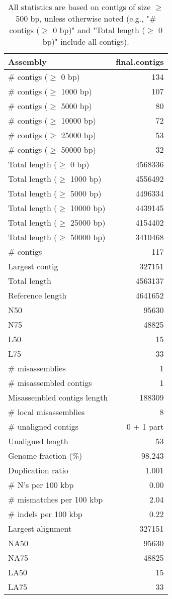 \documentclass[12pt,a4paper]{article}
\begin{document}
\begin{table}[ht]
\begin{center}
\caption{All statistics are based on contigs of size $\geq$ 500 bp, unless otherwise noted (e.g., "\# contigs ($\geq$ 0 bp)" and "Total length ($\geq$ 0 bp)" include all contigs).}
\begin{tabular}{|l*{1}{|r}|}
\hline
Assembly & final.contigs \\ \hline
\# contigs ($\geq$ 0 bp) & 134 \\ \hline
\# contigs ($\geq$ 1000 bp) & 107 \\ \hline
\# contigs ($\geq$ 5000 bp) & 80 \\ \hline
\# contigs ($\geq$ 10000 bp) & 72 \\ \hline
\# contigs ($\geq$ 25000 bp) & 53 \\ \hline
\# contigs ($\geq$ 50000 bp) & 32 \\ \hline
Total length ($\geq$ 0 bp) & 4568336 \\ \hline
Total length ($\geq$ 1000 bp) & 4556492 \\ \hline
Total length ($\geq$ 5000 bp) & 4496334 \\ \hline
Total length ($\geq$ 10000 bp) & 4439145 \\ \hline
Total length ($\geq$ 25000 bp) & 4154402 \\ \hline
Total length ($\geq$ 50000 bp) & 3410468 \\ \hline
\# contigs & 117 \\ \hline
Largest contig & 327151 \\ \hline
Total length & 4563137 \\ \hline
Reference length & 4641652 \\ \hline
N50 & 95630 \\ \hline
N75 & 48825 \\ \hline
L50 & 15 \\ \hline
L75 & 33 \\ \hline
\# misassemblies & 1 \\ \hline
\# misassembled contigs & 1 \\ \hline
Misassembled contigs length & 188309 \\ \hline
\# local misassemblies & 8 \\ \hline
\# unaligned contigs & 0 + 1 part \\ \hline
Unaligned length & 53 \\ \hline
Genome fraction (\%) & 98.243 \\ \hline
Duplication ratio & 1.001 \\ \hline
\# N's per 100 kbp & 0.00 \\ \hline
\# mismatches per 100 kbp & 2.04 \\ \hline
\# indels per 100 kbp & 0.22 \\ \hline
Largest alignment & 327151 \\ \hline
NA50 & 95630 \\ \hline
NA75 & 48825 \\ \hline
LA50 & 15 \\ \hline
LA75 & 33 \\ \hline
\end{tabular}
\end{center}
\end{table}
\end{document}
